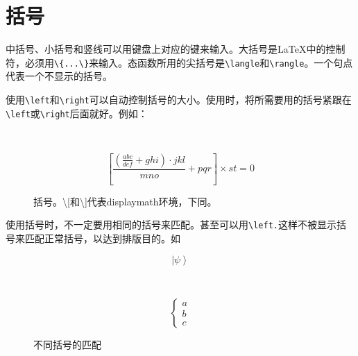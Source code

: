 \section{括号}
中括号、小括号和竖线可以用键盘上对应的键来输入。大括号是\LaTeX{}中的控制符，必须用\verb|\{...\}|来输入。态函数所用的尖括号是\verb|\langle|和\verb|\rangle|。一个句点代表一个不显示的括号。

使用\verb|\left|和\verb|\right|可以自动控制括号的大小。使用时，将所需要用的括号紧跟在\verb|\left|或\verb|\right|后面就好。例如：
\begin{figure}[ht]
\centering
{}\\
\vskip10pt
\begin{minipage}[h]{0.8\textwidth}
\centering
\begin{code}
\[
\left[\frac{\left(\frac{abc}{def}+ghi\right)\cdot jkl}{mno}+pqr\right]
\times st=0
\]
\end{code}
\end{minipage}
\caption{括号。\textbackslash[和\textbackslash]代表displaymath环境，下同。}
\end{figure}



使用括号时，不一定要用相同的括号来匹配。甚至可以用\verb|\left.|这样不被显示括号来匹配正常括号，以达到排版目的。如
\begin{figure}[h]
\centering
{}
\hspace{0.1\textwidth}
\begin{minipage}[h]{0.4\textwidth}
\centering
\begin{code}
\[\left|\psi\right\rangle\]
\end{code}
\end{minipage}\\
\vskip10pt
\hspace{0.1\textwidth}
\begin{minipage}[h]{0.4\textwidth}
\centering
\begin{code}
\[\left\{\begin{array}{c}
a\\b\\c
\end{array}\right.\]
\end{code}
\end{minipage}
\caption{不同括号的匹配}
\end{figure}


